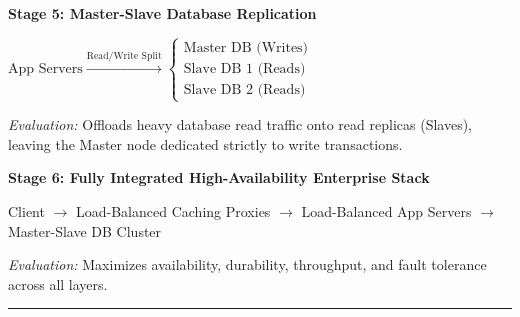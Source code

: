 ﻿\documentclass[8pt, a4paper]{article}
\begin{document}
\begin{conceptbox}
\textbf{Stage 5: Master-Slave Database Replication}

\smallskip
$\text{App Servers} \xrightarrow{\text{Read/Write Split}}
\begin{cases}
  \text{Master DB (Writes)} \\
  \text{Slave DB 1 (Reads)} \\
  \text{Slave DB 2 (Reads)}
\end{cases}$

\smallskip
\textit{Evaluation:} Offloads heavy database read traffic onto read replicas (Slaves), leaving the Master node dedicated strictly to write transactions.
\end{conceptbox}

\begin{conceptbox}
\textbf{Stage 6: Fully Integrated High-Availability Enterprise Stack}

\smallskip
Client $\to$ Load-Balanced Caching Proxies $\to$ Load-Balanced App Servers $\to$ Master-Slave DB Cluster

\smallskip
\textit{Evaluation:} Maximizes availability, durability, throughput, and fault tolerance across all layers.
\end{conceptbox}

\vspace{14pt}
\textcolor{rulegray}{\rule{\linewidth}{1pt}}
\end{document}
